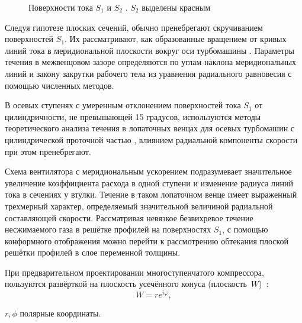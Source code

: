 \begin{figure} [ht]
	\caption{Поверхности тока \(S_1\) и \(S_2\) \cite{Wu1952}. \(S_2\) выделены красным} 
	\label{fig:s1s2}
\end{figure}

Следуя гипотезе плоских сечений, обычно пренебрегают скручиванием поверхностей \(S_1\). Их рассматривают, как образованные вращением от кривых линий тока в меридиональной плоскости вокруг оси турбомашины \cite{Sirotkin1972}. Параметры течения в межвенцовом зазоре определяются по углам наклона меридиональных линий и закону закрутки рабочего тела из уравнения радиального равновесия \cite{Smith1966} с помощью численных методов.

В осевых ступенях с умеренным отклонением поверхностей тока \(S_1\) от цилиндричности, не превышающей 15 градусов, используются методы теоретического анализа течения в лопаточных венцах для осевых турбомашин с цилиндрической проточной частью \cite{Sirotkin1972,Stepanov1962}, влиянием радиальной компоненты скорости при этом пренебрегают. 

Схема вентилятора с меридиональным ускорением подразумевает значительное увеличение коэффициента расхода в одной ступени и изменение радиуса линий тока в сечениях у втулки. Течение в таком лопаточном венце имеет выраженный трехмерный характер, определяемый значительной величиной радиальной составляющей скорости. Рассматривая невязкое безвихревое течение несжимаемого газа в решётке профилей на поверхностях \(S_1\), с помощью конформного отображения можно перейти к рассмотрению обтекания плоской решётки профилей в слое переменной толщины. 

При предварительном проектировании многоступенчатого компрессора, пользуются развёрткой на плоскость усечённого конуса (плоскость~\(W\))~\cite{Sachkova2000}: 
\begin{equation}
	W = r e^{i\varphi},
\end{equation}
\begin{eqexpl}
	\item{\(r, \phi\)} полярные координаты.
\end{eqexpl}


